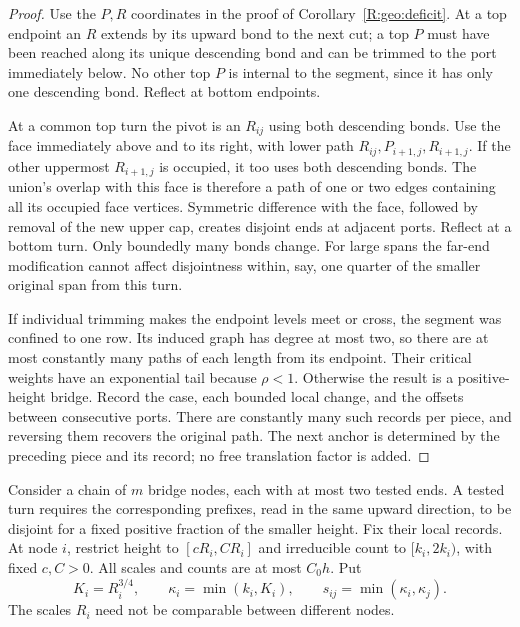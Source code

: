 \begin{proof}
Use the $P,R$ coordinates in the proof of
Corollary~\ref{R:geo:deficit}.  At a top endpoint an $R$ extends by its
upward bond to the next cut; a top $P$ must have been reached along its
unique descending bond and can be trimmed to the port immediately below.
No other top $P$ is internal to the segment, since it has only one
descending bond.  Reflect at bottom endpoints.

At a common top turn the pivot is an $R_{ij}$ using both descending bonds.
Use the face immediately above and to its right, with lower path
$R_{ij},P_{i+1,j},R_{i+1,j}$.  If the other uppermost $R_{i+1,j}$ is
occupied, it too uses both descending bonds.  The union's overlap with
this face is therefore a path of one or two edges containing all its
occupied face vertices.  Symmetric difference with the face, followed by
removal of the new upper cap, creates disjoint ends at adjacent ports.
Reflect at a bottom turn.  Only boundedly many bonds change.  For large
spans the far-end modification cannot affect disjointness within, say,
one quarter of the smaller original span from this turn.

If individual trimming makes the endpoint levels meet or cross, the
segment was confined to one row.  Its induced graph has degree at most
two, so there are at most constantly many paths of each length from its
endpoint.  Their critical weights have an exponential tail because
$\rho<1$.  Otherwise the result is a positive-height bridge.  Record the
case, each bounded local change, and the offsets between consecutive
ports.  There are constantly many such records per piece, and reversing
them recovers the original path.  The next anchor is determined by the
preceding piece and its record; no free translation factor is added.
\end{proof}

Consider a chain of $m$ bridge nodes, each with at most two tested ends.
A tested turn requires the corresponding prefixes, read in the same
upward direction, to be disjoint for a fixed positive fraction of the
smaller height.  Fix their local records.  At node $i$, restrict height
to $[cR_i,CR_i]$ and irreducible count to $[k_i,2k_i)$, with fixed
$c,C>0$.  All scales and counts are at most $C_0h$.  Put
\[
 K_i=R_i^{3/4},\qquad \kappa_i=\min(k_i,K_i),\qquad
 s_{ij}=\min(\kappa_i,\kappa_j).
\]
The scales $R_i$ need not be comparable between different nodes.


